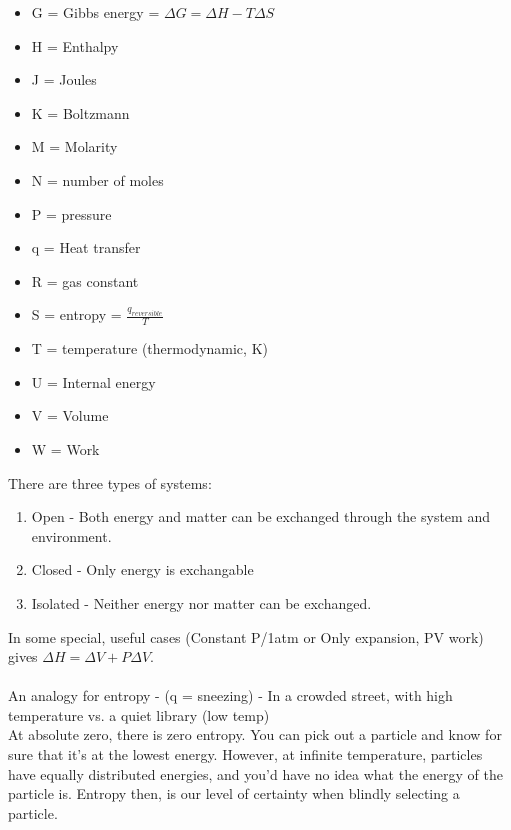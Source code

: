 \documentclass[10pt, twocolumn]{report}
\begin{document}
    \begin{itemize}
        \item G = Gibbs energy = $\Delta G = \Delta H - T\Delta S$
        \item H = Enthalpy
        \item J = Joules
        \item K = Boltzmann
        \item M = Molarity
        \item N = number of moles
        \item P = pressure
        \item q = Heat transfer
        \item R = gas constant
        \item S = entropy = $\frac{q_{reversible}}{T}$
        \item T = temperature (thermodynamic, K)
        \item U = Internal energy
        \item V = Volume
        \item W = Work
    \end{itemize}
    There are three types of systems:
    \begin{enumerate}
        \item Open - Both energy and matter can be exchanged through the system and environment.
        \item Closed - Only energy is exchangable
        \item Isolated - Neither energy nor matter can be exchanged.
     \end{enumerate}
     In some special, useful cases (Constant P/1atm or Only expansion, PV work) gives $\Delta H = \Delta V + P \Delta V$.\\\\
     An analogy for entropy - (q = sneezing) - In a crowded street, with high temperature vs. a quiet library (low temp)\\ At absolute zero, there is zero entropy. You can pick out a particle and know for sure that it's at the lowest energy. However, at infinite temperature, particles have equally distributed energies, and you'd have no idea what the energy of the particle is. Entropy then, is our level of certainty when blindly selecting a particle.
\end{document}
